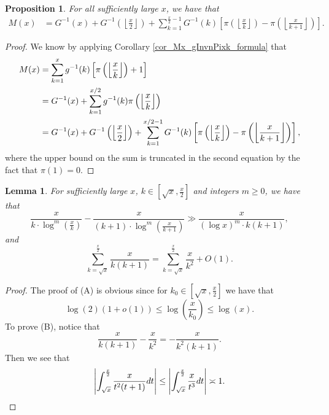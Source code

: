 \documentclass[11pt,reqno,a4letter]{article}
\numberwithin{figure}{section}
\numberwithin{table}{section}
\newcommand{\Floor}[2]{\ensuremath{\left\lfloor \frac{#1}{#2} \right\rfloor}}
\theoremstyle{plain}
\newtheorem{prop}[theorem]{Proposition}
\newtheorem{lemma}[theorem]{Lemma}
\numberwithin{theorem}{section}
\theoremstyle{definition}
\begin{document}
\begin{prop} 
\label{prop_Mx_SBP_IntegralFormula} 
For all sufficiently large $x$, we have that 
\begin{align} 
\label{eqn_pf_tag_v2-restated_v2} 
M(x) & = G^{-1}(x) + G^{-1}\left(\Floor{x}{2}\right) + 
     \sum_{k=1}^{\frac{x}{2}-1} G^{-1}(k) \left[ 
     \pi\left(\Floor{x}{k}\right) - \pi\left(\Floor{x}{k+1}\right) 
     \right]. 
\end{align} 
\end{prop} 
\begin{proof} 
We know by applying Corollary \ref{cor_Mx_gInvnPixk_formula} that 
\begin{align} 
\notag
M(x) & = \sum_{k=1}^{x} g^{-1}(k) \left[\pi\left(\Floor{x}{k}\right)+1\right] \\ 
\notag 
     & = G^{-1}(x) + \sum_{k=1}^{x/2} g^{-1}(k) \pi\left(\Floor{x}{k}\right) \\ 
\notag 
     & = G^{-1}(x) + G^{-1}\left(\Floor{x}{2}\right) + 
     \sum_{k=1}^{x/2-1} G^{-1}(k) \left[ 
     \pi\left(\Floor{x}{k}\right) - \pi\left(\Floor{x}{k+1}\right) 
     \right], 
\end{align} 
where the upper bound on the sum is truncated in the second equation 
by the fact that $\pi(1) = 0$. 
\end{proof} 

\begin{lemma}
\label{lemma_PrimePix_ErrorBoundDiffs_SimplifyingConditions_v1} 
For sufficiently large $x$, $k \in \left[\sqrt{x}, \frac{x}{2}\right]$ and 
integers $m \geq 0$, we have that 
\begin{equation} 
\tag{A} 
\frac{x}{k \cdot \log^m\left(\frac{x}{k}\right)} - 
     \frac{x}{(k+1) \cdot \log^m\left(\frac{x}{k+1}\right)}
     \gg \frac{x}{(\log x)^m \cdot k(k+1)}, 
\end{equation} 
and 
\begin{equation} 
\tag{B} 
\sum_{k=\sqrt{x}}^{\frac{x}{2}} \frac{x}{k(k+1)} = 
     \sum_{k=\sqrt{x}}^{\frac{x}{2}} \frac{x}{k^2} + O(1). 
\end{equation} 
\end{lemma} 
\begin{proof} 
The proof of (A) is obvious since for $k_0 \in \left[\sqrt{x}, \frac{x}{2}\right]$ we have that 
\[
\log(2) (1 + o(1)) \leq \log\left(\frac{x}{k_0}\right) \leq \log(x). 
\]
To prove (B), notice that 
\[
\frac{x}{k(k+1)} - \frac{x}{k^2} = -\frac{x}{k^2(k+1)}. 
\]
Then we see that 
\[
\left\lvert \int_{\sqrt{x}}^{\frac{x}{2}} \frac{x}{t^2(t+1)} dt \right\rvert \leq 
     \left\lvert \int_{\sqrt{x}}^{\frac{x}{2}} \frac{x}{t^3} dt \right\rvert \asymp 1. 
     \qedhere 
\]
\end{proof} 
\end{document}
